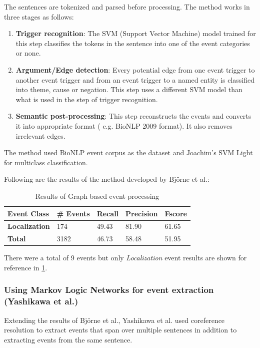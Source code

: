 The sentences are tokenized and parsed before processing. The method works in three stages as follows: 

\begin{enumerate}
\item \textbf{Trigger recognition}: The SVM (Support Vector Machine) model trained for this step classifies the tokens in the sentence into one of the event categories or none.

\item \textbf{Argument/Edge detection}: Every potential edge from one event trigger to another event trigger and from an event trigger to a named entity is classified into theme, cause or negation. This step uses a different SVM model than what is used in the step of trigger recognition.

\item \textbf{Semantic post-processing}: This step reconstructs the events and converts it into appropriate format ( e.g. BioNLP 2009 format). It also removes irrelevant edges. 
\end{enumerate}

The method used BioNLP event corpus as the dataset and Joachim's SVM Light \cite{bjorne2009extracting} for multiclass classification. 

Following are the results of the method developed by Björne et al.:

\begin{table}[h]
\centering
\begin{tabular}{|l|l|l|l|l|}
\hline
\textbf{Event Class} & \textbf{\# Events} & \textbf{Recall} & \textbf{Precision} & \textbf{Fscore} \\ \hline
\textbf{Localization} & 174 & 49.43 & 81.90 & 61.65 \\
\textbf{Total} & 3182 & 46.73 & 58.48 & 51.95\\ \hline
\end{tabular}
\caption{Results of Graph based event processing}\label{tab:Jari}
\end{table}

There were a total of 9 events but only \textit{Localization} event results are shown for reference in \ref{tab:Jari}.

\subsubsection{Using Markov Logic Networks for event extraction (Yashikawa et al.)}

Extending the results of Björne et al., Yashikawa et al. \cite{yoshikawa2011coreference} used coreference resolution to extract events that span over multiple sentences in addition to extracting events from the same sentence. 

